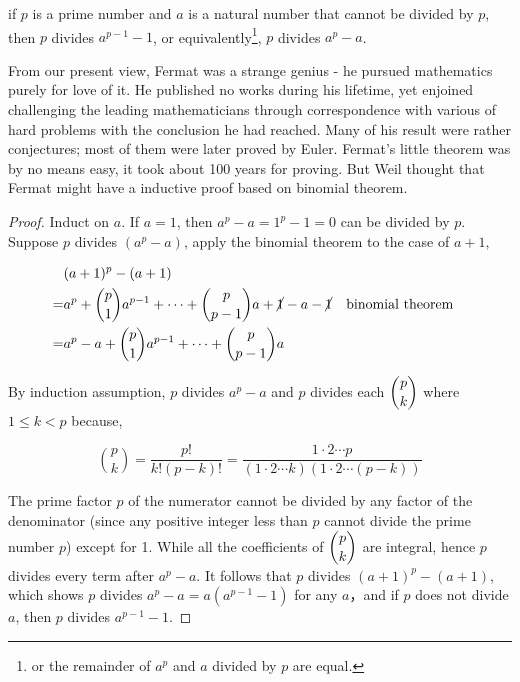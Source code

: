\documentclass[b5paper]{article}
\begin{document}
\begin{theorem}\label{thm:fermats-little-theorem}
if $p$ is a prime number and $a$ is a natural number that cannot be divided by $p$, then $p$ divides $a^{p-1}-1$, or equivalently\footnote{or the remainder of $a^p$ and $a$ divided by $p$ are equal.}, $p$ divides $a^p - a$.
\end{theorem}

From our present view, Fermat was a strange genius - he pursued mathematics purely for love of it. He published no works during his lifetime, yet enjoined challenging the leading mathematicians through correspondence with various of hard problems with the conclusion he had reached. Many of his result were rather conjectures; most of them were later proved by Euler. Fermat's little theorem was by no means easy, it took about 100 years for proving. But Weil thought that Fermat might have a inductive proof based on binomial theorem\cite{Weil-1983}.

\begin{proof}
Induct on $a$. If $a = 1$, then $a^p - a = 1^p - 1 = 0$ can be divided by $p$. Suppose $p$ divides $(a^p - a)$, apply the binomial theorem to the case of $a + 1$,

\begin{align*}
 & (a + 1)^p - (a + 1) \\
= & a^p + \binom{p}{1}a^{p-1} + \dotsb + \binom{p}{p-1}a + \cancel{1} - a - \cancel{1} && \text{binomial theorem} \\
= & a^p - a + \binom{p}{1}a^{p-1} + \dotsb + \binom{p}{p-1}a
\end{align*}

By induction assumption, $p$ divides $a^p - a$ and $p$ divides each $\dbinom{p}{k}$ where $1 \leq k < p$ because,

\[
\binom{p}{k} = \frac{p!}{k!(p-k)!} = \frac{1\cdot2\dotsm p}{(1\cdot2\dotsm k)(1 \cdot 2 \dotsm (p-k))}
\]

The prime factor $p$ of the numerator cannot be divided by any factor of the denominator (since any positive integer less than $p$ cannot divide the prime number $p$) except for 1. While all the coefficients of $\dbinom{p}{k}$ are integral, hence $p$ divides every term after $a^p - a$. It follows that $p$ divides $(a + 1)^p - (a + 1)$, which shows $p$ divides $a^p - a = a(a^{p-1} -1)$ for any $a$，and if $p$ does not divide $a$, then $p$ divides $a^{p-1} - 1$.
\end{proof}
\end{document}
